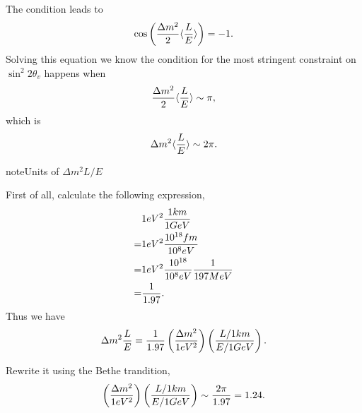 \documentclass[letterpaper,12pt,english]{sphinxmanual}
\begin{document}
The condition leads to
\begin{gather}
\begin{split}\cos\left( \frac{\Delta m^2}{2} \langle \frac{L}{E} \rangle \right) = -1.\end{split}\notag
\end{gather}
Solving this equation we know the condition for the most stringent constraint on \(\sin^2 2\theta_v\) happens when
\begin{gather}
\begin{split}\frac{\Delta m^2}{2} \langle \frac{L}{E} \rangle \sim \pi,\end{split}\notag
\end{gather}
which is
\begin{gather}
\begin{split}\Delta m^2 \langle \frac{L}{E} \rangle \sim 2\pi.\end{split}\notag
\end{gather}
\begin{notice}{note}{Units of \(\Delta m^2  L/E\)}

First of all, calculate the following expression,
\begin{gather}
\begin{split}&1 eV^2 \frac{1km}{1GeV} \\
=& 1eV^2 \frac{10^{18}fm}{10^8 eV} \\
=& 1eV^2 \frac{10^{18}}{10^8 eV} \frac{1}{197 MeV} \\
=& \frac{1}{1.97}.\end{split}\notag
\end{gather}
Thus we have
\begin{gather}
\begin{split}\Delta m^2   \frac{L}{E} = \frac{1}{1.97} \left( \frac{\Delta m^2}{1eV^2} \right) \left(  \frac{L/1km}{E/1GeV} \right).\end{split}\notag
\end{gather}\end{notice}

Rewrite it using the Bethe trandition,
\begin{gather}
\begin{split}\left( \frac{\Delta m^2}{1eV^2} \right) \left(  \frac{L/1km}{E/1GeV} \right) \sim \frac{2\pi}{1.97} = 1.24.\end{split}\notag
\end{gather}
\end{document}
